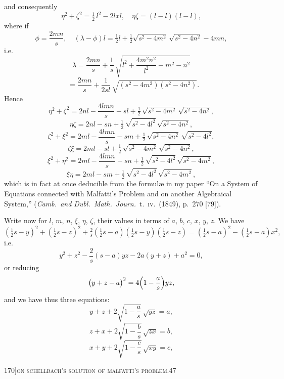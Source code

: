 \documentclass[11pt]{article}
\begin{document}
\medskip

\noindent and consequently
\[
\eta^{2} + \zeta^{2} = \tfrac{1}{2}\,l^{2} - 2lxl,\quad \eta\zeta = (l - l)(l - l),
\]
where if
\[
\phi = \frac{2 m n}{s},\quad (\lambda - \phi)l = \tfrac{1}{2}l + \tfrac{1}{2}\sqrt{s^{2} - 4m^{2}}\,\sqrt{s^{2} - 4n^{2}} - 4m n,
\]
i.e.
\[
\lambda = \frac{2 m n}{s} + \frac{1}{s}\,\sqrt{l^{2} + \frac{4 m^{2} n^{2}}{l^{2}} - m^{2} - n^{2}}
\]
\[
\phantom{\lambda} = \frac{2 m n}{s} + \frac{1}{2 s l}\,\sqrt{(s^{2} - 4 m^{2})(s^{2} - 4 n^{2})}.
\]
Hence
\[
\eta^{2} + \zeta^{2} = 2 n l - \frac{4 l m n}{s} - sl + \tfrac{1}{2}\,\sqrt{s^{2} - 4 m^{2}}\,\sqrt{s^{2} - 4 n^{2}},
\]
\[
\eta\zeta = 2 n l - sn + \tfrac{1}{2}\,\sqrt{s^{2} - 4 l^{2}}\,\sqrt{s^{2} - 4 n^{2}},
\]
\[
\zeta^{2} + \xi^{2} = 2 m l - \frac{4 l m n}{s} - sm + \tfrac{1}{2}\,\sqrt{s^{2} - 4 n^{2}}\,\sqrt{s^{2} - 4 l^{2}},
\]
\[
\zeta\xi = 2 m l - sl + \tfrac{1}{2}\,\sqrt{s^{2} - 4 m^{2}}\,\sqrt{s^{2} - 4 n^{2}},
\]
\[
\xi^{2} + \eta^{2} = 2 m l - \frac{4 l m n}{s} - sn + \tfrac{1}{2}\,\sqrt{s^{2} - 4 l^{2}}\,\sqrt{s^{2} - 4 m^{2}},
\]
\[
\xi\eta = 2 m l - sm + \tfrac{1}{2}\,\sqrt{s^{2} - 4 l^{2}}\,\sqrt{s^{2} - 4 m^{2}},
\]
which is in fact at once deducible from the formul\ae{} in my paper ``On a System of
Equations connected with Malfatti's Problem and on another Algebraical System,''
(\textit{Camb.\ and Dubl.\ Math.\ Journ.}\ t.~\textsc{iv}.\ (1849), p.~270 [79]).

Write now for $l$, $m$, $n$, $\xi$, $\eta$, $\zeta$, their values in terms of $a$, $b$, $c$, $x$, $y$, $z$. We have
\[
(\tfrac{1}{2}s - y)^{2} + (\tfrac{1}{2}s - z)^{2} + \tfrac{2}{s}(\tfrac{1}{2}s - a)(\tfrac{1}{2}s - y)(\tfrac{1}{2}s - z) = (\tfrac{1}{2}s - a)^{2} - (\tfrac{1}{2}s - a)x^{2},
\]
i.e.
\[
y^{2} + z^{2} - \frac{2}{s}(s - a)yz - 2a(y + z) + a^{2} = 0,
\]
or reducing
\[
\bigl(y + z - a\bigr)^{2} = 4\Bigl(1 - \frac{a}{s}\Bigr)yz,
\]
and we have thus three equations:
\[
y + z + 2\sqrt{1 - \frac{a}{s}}\,\sqrt{y z} = a,
\]
\[
z + x + 2\sqrt{1 - \frac{b}{s}}\,\sqrt{z x} = b,
\]
\[
x + y + 2\sqrt{1 - \frac{c}{s}}\,\sqrt{x y} = c,
\]

\newpage

\begin{center}
\small 170]\hfill\textsc{on schellbach's solution of malfatti's problem.}\hfill\textsc{47}
\end{center}

\medskip
\end{document}
